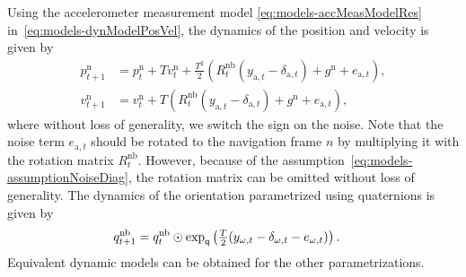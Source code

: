 Using the accelerometer measurement model \eqref{eq:models-accMeasModelRes} in~\eqref{eq:models-dynModelPosVel}, the dynamics of the position and velocity is given by 
\begin{subequations}
\begin{align}
p_{t+1}^\text{n} &= p_t^\text{n} + T v_t^\text{n} + \tfrac{T^2}{2} \left( R^\text{nb}_t (y_{\text{a},t} - \delta_{\text{a},t}) + g^\text{n} + e_{\text{a},t} \right), \\
v_{t+1}^\text{n} &= v_t^\text{n} + T \left( R^\text{nb}_t (y_{\text{a},t} - \delta_{\text{a},t}) + g^\text{n} + e_{\text{a},t} \right),
\end{align}
\end{subequations}
where without loss of generality, we switch the sign on the noise. Note that the noise term $e_{\text{a},t}$ should be rotated to the navigation frame $n$ by multiplying it with the rotation matrix $R^\text{nb}_t$. However, because of the assumption~\eqref{eq:models-assumptionNoiseDiag}, the rotation matrix can be omitted without loss of generality. The dynamics of the orientation parametrized using quaternions is given by
\begin{align}
q^\text{nb}_{t+1} &= q_t^\text{nb} \odot \exp_\mathsf{q} \left( \tfrac{T}{2} (y_{\omega,t} - \delta_{\omega,t} - e_{\omega,t} ) \right).
\end{align}
Equivalent dynamic models can be obtained for the other parametrizations. 

